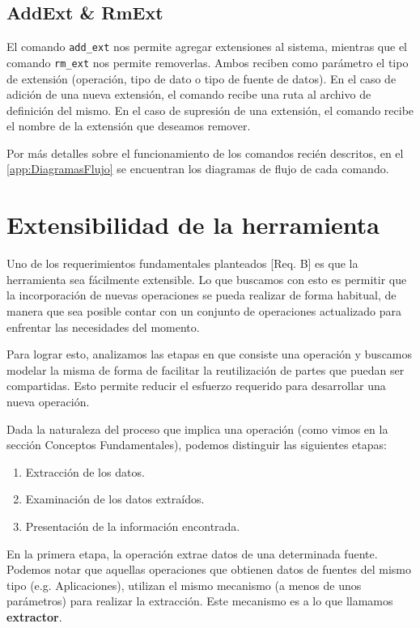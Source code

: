 \subsection*{AddExt \& RmExt}
El comando \texttt{add\_ext} nos permite agregar extensiones al sistema, mientras que el comando \texttt{rm\_ext} nos permite removerlas. Ambos reciben como parámetro el tipo de extensión (operación, tipo de dato o tipo de fuente de datos). En el caso de adición de una nueva extensión, el comando recibe una ruta al archivo de definición del mismo. En el caso de supresión de una extensión, el comando recibe el nombre de la extensión que deseamos remover.
\newline

Por más detalles sobre el funcionamiento de los comandos recién descritos, en el \autoref{app:DiagramasFlujo} se encuentran los diagramas de flujo de cada comando.

\section{Extensibilidad de la herramienta}
\label{extensibilidadDeLaHerramienta}
Uno de los requerimientos fundamentales planteados [Req. B] es que la herramienta sea fácilmente extensible. Lo que buscamos con esto es permitir que la incorporación de nuevas operaciones se pueda realizar de forma habitual, de manera que sea posible contar con un conjunto de operaciones actualizado para enfrentar las necesidades del momento.

Para lograr esto, analizamos las etapas en que consiste una operación y buscamos modelar la misma de forma de facilitar la reutilización de partes que puedan ser compartidas. Esto permite reducir el esfuerzo requerido para desarrollar una nueva operación.

Dada la naturaleza del proceso que implica una operación (como vimos en la sección Conceptos Fundamentales), podemos distinguir las siguientes etapas:
\begin{enumerate}[topsep=0pt, parsep=0pt, partopsep=0pt]
\item Extracción de los datos.
\item Examinación de los datos extraídos.
\item Presentación de la información encontrada.
\end{enumerate}

En la primera etapa, la operación extrae datos de una determinada fuente. Podemos notar que aquellas operaciones que obtienen datos de fuentes del mismo tipo (e.g. Aplicaciones), utilizan el mismo mecanismo (a menos de unos parámetros) para realizar la extracción. Este mecanismo es a lo que llamamos \textbf{extractor}.

